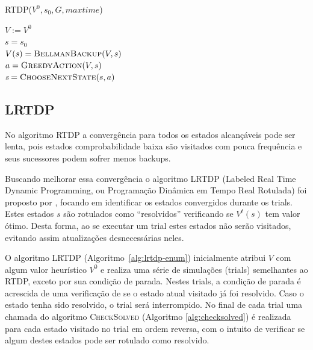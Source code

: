 \documentclass[letterpaper]{article}
\begin{document}
\linesnumbered
\begin{algorithm}[t]
{
	\caption{\textsc{RTDP}($ V^0, s_0, G, maxtime $)}
	\label{alg:rtdp-enum}

	$V := V^0$\\

	{
    	$\textit{s} = s_0 $\\

		{
			$V(s) = \textsc{BellmanBackup}(V, s)$ \\
           	$a = \textsc{GreedyAction}(V, s)$ \\
           	$\textit{s} = \textsc{ChooseNextState}(s, a)$ \\
		}
	}
}
\end{algorithm}


\subsection{LRTDP}

No algoritmo RTDP a convergência para todos os estados alcançáveis pode ser lenta, pois estados comprobabilidade baixa são visitados com pouca frequência e seus sucessores podem sofrer menos backups.

Buscando melhorar essa convergência o algoritmo LRTDP (Labeled Real Time Dynamic Programming, ou Programação Dinâmica em Tempo Real Rotulada) foi proposto por \cite{BonetGeffer-2003}, focando em identificar
os estados convergidos durante os trials. Estes estados $s$ são rotulados como ``resolvidos'' verificando se $V^t(s)$ tem
valor ótimo. Desta forma, ao se executar um trial estes estados não serão visitados, evitando assim atualizações desnecessárias neles.

O algoritmo LRTDP (Algoritmo~\ref{alg:lrtdp-enum}) inicialmente atribui $V$ com algum valor heurístico $V^0$ e realiza uma série de simulações (trials) semelhantes ao RTDP, exceto por sua condição de parada. Nestes trials, a condição de parada é acrescida de uma verificação de se o estado atual visitado já foi resolvido. Caso o estado tenha sido resolvido, o trial será interrompido. No final de cada trial uma chamada do algoritmo \textsc{CheckSolved} (Algoritmo \ref{alg:checksolved}) é realizada para cada estado visitado no trial em ordem reversa, com o intuito de verificar se algum destes estados pode ser rotulado como resolvido.
\end{document}
